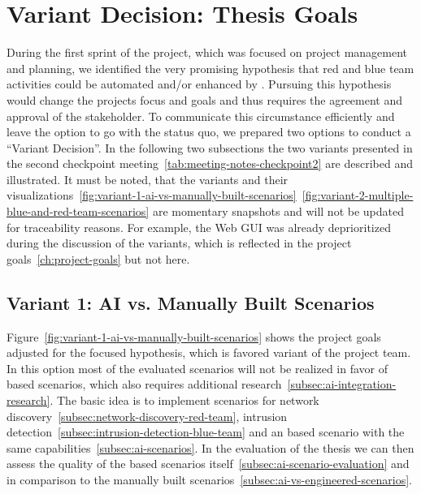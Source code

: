 
\newpage
\section{Variant Decision: Thesis Goals}\label{sec:variant-decision-thesis-goals}

During the first sprint of the project, which was focused on project management and planning,
we identified the very promising hypothesis that red and blue team activities could be automated and/or enhanced by .
Pursuing this hypothesis would change the projects focus and goals and thus requires the agreement and approval of the stakeholder.
To communicate this circumstance efficiently and leave the option to go with the status quo, we prepared two options to conduct a \enquote{Variant Decision}.
In the following two subsections the two variants presented in the second checkpoint meeting~\ref{tab:meeting-notes-checkpoint2} are described and illustrated.
It must be noted, that the variants and their visualizations~\ref{fig:variant-1-ai-vs-manually-built-scenarios}~\ref{fig:variant-2-multiple-blue-and-red-team-scenarios} are momentary snapshots and will not be updated for traceability reasons.
For example, the Web \gls{GUI} was already deprioritized during the discussion of the variants, which is reflected in the project goals~\ref{ch:project-goals} but not here.

\subsection{Variant 1: AI vs. Manually Built Scenarios}\label{subsec:variant-1-ai-vs-manually-built-scenarios}

Figure~\ref{fig:variant-1-ai-vs-manually-built-scenarios} shows the project goals adjusted for the  focused hypothesis, which is favored variant of the project team.
In this option most of the evaluated scenarios will not be realized in favor of  based scenarios, which also requires additional research~\ref{subsec:ai-integration-research}.
The basic idea is to implement scenarios for network discovery~\ref{subsec:network-discovery-red-team}, intrusion detection~\ref{subsec:intrusion-detection-blue-team} and an  based scenario with the same capabilities~\ref{subsec:ai-scenarios}.
In the evaluation of the thesis we can then assess the quality of the  based scenarios itself~\ref{subsec:ai-scenario-evaluation} and in comparison to the manually built scenarios~\ref{subsec:ai-vs-engineered-scenarios}.


